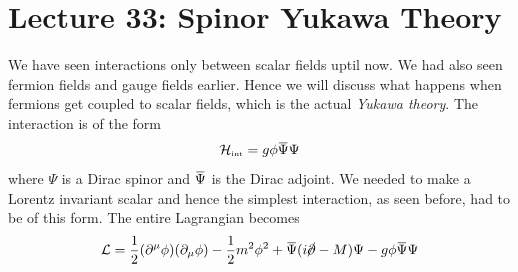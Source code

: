 \section*{Lecture 33: Spinor Yukawa Theory}
We have seen interactions only between scalar fields uptil now. We had also seen fermion fields and gauge fields earlier. Hence we will discuss what happens when fermions get coupled to scalar fields, which is the actual \textit{Yukawa theory}. The interaction is of the form 
$$\SH\tund{int} = g \phi\dadj{\Psi}\Psi$$
where $\Psi$ is a Dirac spinor and $\dadj{\Psi}$ is the Dirac adjoint. We needed to make a Lorentz invariant scalar and hence the simplest interaction, as seen before, had to be of this form. The entire Lagrangian becomes 
$$\SL = \frac{1}{2}(\partial^\mu \phi)(\partial_\mu \phi)-\frac{1}{2}m^2\phi^2+\dadj{\Psi}(i\gsl{\partial}-M)\Psi -g \phi\dadj{\Psi}\Psi$$
